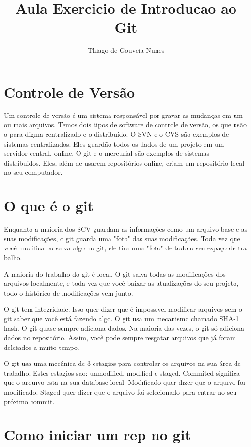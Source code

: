 \documentclass{article}
\begin{document}
\title{Aula Exercicio de Introducao ao Git}
\author{Thiago de Gouveia Nunes}
\maketitle

\section{Controle de Versão}
    Um controle de versão é um sistema responsável por gravar as mudanças em um
    ou mais arquivos.
    Temos dois tipos de software de controle de versão, os que usão o para
    digma centralizado e o distribuído. O SVN e o CVS são exemplos de sistemas
    centralizados. Eles guardão todos os dados de um projeto em um servidor central,
    online. O git e o mercurial são exemplos de sistemas distribuidos. Eles, além
    de usarem repositórios online, criam um repositório local no seu computador.

\section{O que é o git}
    Enquanto a maioria dos SCV guardam as informações como um arquivo base e as suas
    modificações, o git guarda uma "foto" das suas modificações. Toda vez que você
    modifica ou salva algo no git, ele tira uma "foto" de todo o seu espaço de tra
    balho.
    
    A maioria do trabalho do git é local. O git salva todas as modificações dos arquivos
    localmente, e toda vez que você baixar as atualizações do seu projeto, todo o
    histórico de modificações vem junto.
    
    O git tem integridade. Isso quer dizer que é impossível modificar arquivos sem o
    git saber que você está fazendo algo. O git usa um mecanismo chamado SHA-1 hash.
    O git quase sempre adiciona dados. Na maioria das vezes, o git só adiciona dados
    no repositório. Assim, você pode sempre resgatar arquivos que já foram deletados
    a muito tempo.
    
    O git usa uma mecânica de 3 estagios para controlar os arquivos na sua área de
    trabalho. Estes estagios sao: unmodified, modified e staged. Commited significa
    que o arquivo esta na sua database local. Modificado quer dizer que o arquivo
    foi modificado. Staged quer dizer que o arquivo foi selecionado para entrar no seu
    próximo commit.

\section{Como iniciar um rep no git}
\end{document}
